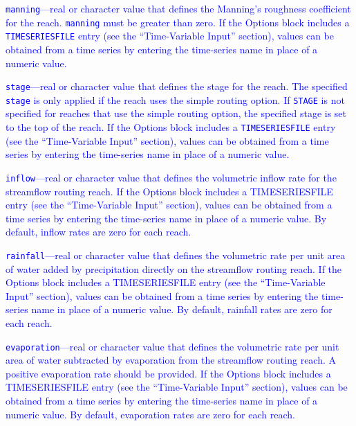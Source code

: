 \begin{description}
\item \textcolor{blue}{\texttt{manning}---real or character value that defines the Manning's roughness coefficient for the reach. \texttt{manning} must be greater than zero.  If the Options block includes a \texttt{TIMESERIESFILE} entry (see the ``Time-Variable Input'' section), values can be obtained from a time series by entering the time-series name in place of a numeric value.}

\item \textcolor{blue}{\texttt{stage}---real or character value that defines the stage for the reach. The specified \texttt{stage} is only applied if the reach uses the simple routing option. If \texttt{STAGE} is not specified for reaches that use the simple routing option, the specified stage is set to the top of the reach. If the Options block includes a \texttt{TIMESERIESFILE} entry (see the ``Time-Variable Input'' section), values can be obtained from a time series by entering the time-series name in place of a numeric value.}

\item \textcolor{blue}{\texttt{inflow}---real or character value that defines the volumetric inflow rate for the streamflow routing reach. If the Options block includes a TIMESERIESFILE entry (see the ``Time-Variable Input'' section), values can be obtained from a time series by entering the time-series name in place of a numeric value. By default, inflow rates are zero for each reach.}

\item \textcolor{blue}{\texttt{rainfall}---real or character value that defines the  volumetric rate per unit area of water added by precipitation directly on the streamflow routing reach. If the Options block includes a TIMESERIESFILE entry (see the ``Time-Variable Input'' section), values can be obtained from a time series by entering the time-series name in place of a numeric value. By default, rainfall  rates are zero for each reach.}

\item \textcolor{blue}{\texttt{evaporation}---real or character value that defines the  volumetric rate per unit area of water subtracted by evaporation from the streamflow routing reach. A positive evaporation rate should be provided. If the Options block includes a TIMESERIESFILE entry (see the ``Time-Variable Input'' section), values can be obtained from a time series by entering the time-series name in place of a numeric value. By default, evaporation rates are zero for each reach.}


\end{description}
